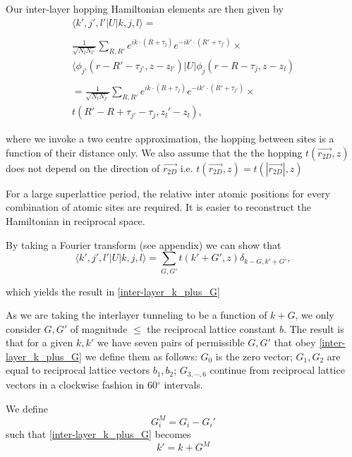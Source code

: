 \documentclass[12pt]{report} %
\begin{document}
  Our inter-layer hopping Hamiltonian elements are then given by
  \begin{multline}
    \langle k',j',l' | U | k, j, l \rangle = \\
    ~\\
    \frac{1}{\sqrt{N_l N_{l'}}} \sum_{R, R'} e^{ik \cdot (R+\tau_j)} e^{-ik' \cdot (R' + \tau_{j'})} \times \\
    \langle \phi_{j'}(r - R' - \tau_{j'}, z - z_{l'}) | U | \phi_j (r - R - \tau_j, z - z_l)\\
    ~\\
     =\frac{1}{\sqrt{N_l N_{l'}}} \sum_{R, R'} e^{ik \cdot (R+\tau_j)} e^{-ik' \cdot (R' + \tau_{j'})} \times \\
     t(R'-R +\tau_{j'} - \tau_j, z_l' - z_l),
    \label{}
  \end{multline}

  where we invoke a two centre approximation, the hopping between sites is a function of their distance only. We also assume that the the hopping $t(\vec{r_{2D}}, z)$ does not depend on the direction of $\vec{r_{2D}}$ i.e. $t(\vec{r_{2D}}, z) = t(|\vec{r_{2D}}|, z)$

  For a large superlattice period, the relative inter atomic positions for every combination of atomic sites are required. It is easier to reconstruct the Hamiltonian in reciprocal space.

  By taking a Fourier transform (see appendix) we can show that
  \begin{equation}
    \langle k',j',l' | U | k, j, l \rangle = \sum_{G, G'} t(k'+G', z) \delta_{k-G, k'+G'},
    \label{inter-layer_hopping_elements}
  \end{equation}
  
  which yields the result in \ref{inter-layer_k_plus_G}
  
  As we are taking the interlayer tunneling to be a function of $k+G$, we only consider $G, G'$ of magnitude $\leq$ the reciprocal lattice constant $b$. The result is that for a given $k, k'$ we have seven pairs of permissible $G, G'$ that obey \ref{inter-layer_k_plus_G} we define them as follows: $G_0$ is the zero vector; $G_1, G_2$ are equal to reciprocal lattice vectors $b_1, b_2$; $G_{3,\cdots,6}$ continue from reciprocal lattice vectors in a clockwise fashion in 60$^\circ$ intervals.

  We define
  \begin{equation}
    G_i^M = G_i - G_i'
    \label{inter-layer_G_M_def}
  \end{equation}
  such that \ref{inter-layer_k_plus_G} becomes
  \begin{equation}
    k' = k + G^M
    \label{inter-layer_k_plus_G_M}
  \end{equation}
\end{document}
